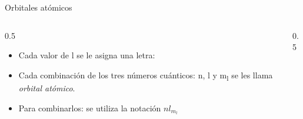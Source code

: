 \documentclass[11pt, aspectratio=169, xcolor=table]{beamer}
\begin{document}
\begin{frame}[label={sec:org2ab9c48}]{Orbitales atómicos}
  \begin{columns}
    \begin{column}{0.5\columnwidth}
      \begin{itemize}[<+->]
        \item Cada valor de l se le asigna una letra:
        \item Cada combinación de los tres números cuánticos: n, l y m\textsubscript{l} se les llama \emph{orbital atómico}.
        \item Para combinarlos: se utiliza la notación \(nl_{m_l}\)
      \end{itemize}
    \end{column}
    \begin{column}{0.5\columnwidth}
      \begin{block}{}

      \end{block}
    \end{column}
  \end{columns}
\end{frame}
\end{document}
